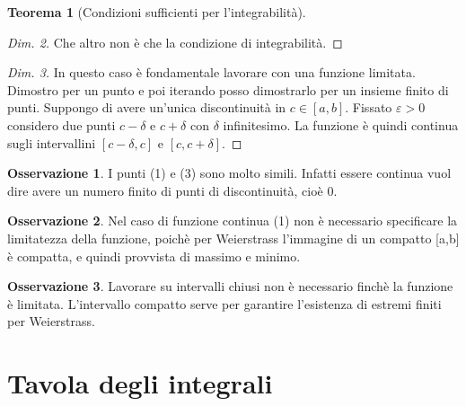 \documentclass{article}
\theoremstyle{definition}
\newtheorem{theorem}{Teorema}[section]
\theoremstyle{definition}
\theoremstyle{definition}
\theoremstyle{definition}
\newtheorem{remark}{Osservazione}[section]
\theoremstyle{definition}
\begin{document}
\begin{theorem}[Condizioni sufficienti per l'integrabilità]
\begin{proof}[Dim. 2]
        Che altro non è che la condizione di integrabilità.
    \end{proof}
    \begin{proof}[Dim. 3]
        In questo caso è fondamentale lavorare con una funzione limitata. Dimostro per un punto e poi iterando posso dimostrarlo per un insieme finito di punti. Suppongo di avere un'unica discontinuità in $c \in [a,b]$. Fissato $\varepsilon>0$ considero due punti $c-\delta$ e $c+\delta$ con $\delta$ infinitesimo. La funzione è quindi continua sugli intervallini $[c-\delta,c]$ e $[c,c+\delta]$.
    \end{proof}
\end{theorem}

\begin{remark}
    I punti (1) e (3) sono molto simili. Infatti essere continua vuol dire avere un numero finito di punti di discontinuità, cioè 0.
\end{remark}

\begin{remark}
    Nel caso di funzione continua (1) non è necessario specificare la limitatezza della funzione, poichè per Weierstrass l'immagine di un compatto [a,b] è compatta, e quindi provvista di massimo e minimo.
\end{remark}

\begin{remark}
    Lavorare su intervalli chiusi non è necessario finchè la funzione è limitata. L'intervallo compatto serve per garantire l'esistenza di estremi finiti per Weierstrass.
\end{remark}
\newpage
\section{Tavola degli integrali}
\end{document}

